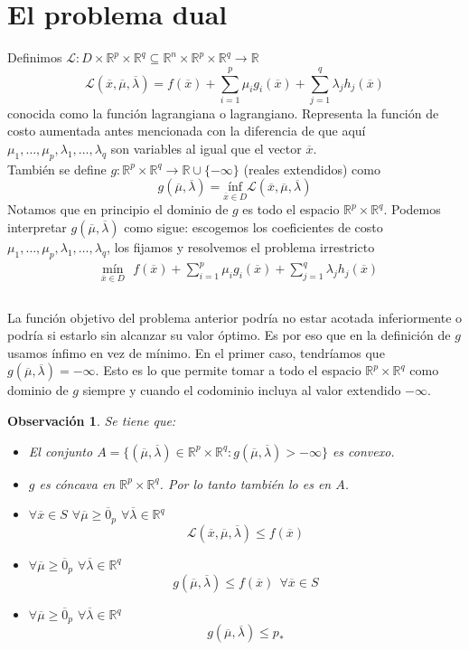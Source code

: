 \documentclass[11pt]{report}
\newtheorem{observation}{Observación}[section]
\newcommand{\Rn}{\mathbb{R}^{n}}
\newcommand{\Rp}{\mathbb{R}^{p}}
\newcommand{\Rq}{\mathbb{R}^{q}}
\newcommand{\R}{\mathbb{R}}
\newcommand{\mv}{\overline{\mu}}
\newcommand{\lv}{\overline{\lambda}}
\newcommand{\x}{\overline{x}}
\newcommand{\zp}{\overline{0}_{p}}
\newcommand{\La}{\mathcal{L}}
\newcommand{\po}{p_{*}}
\begin{document}
\section{El problema dual}
Definimos $\La: D\times\Rp\times\Rq\subseteq\Rn\times\Rp\times\Rq\rightarrow\R$ $$\La(\x,\mv,\lv)=f(\x)+\sum_{i=1}^{p}\mu_{i} g_{i}(\x) + \sum_{j=1}^{q}\lambda_{j} h_{j}(\x)$$
conocida como la función lagrangiana o lagrangiano. Representa la función de costo aumentada antes mencionada con la diferencia de que aquí $\mu_{1},\ldots,\mu_{p}, \lambda_{1},\ldots,\lambda_{q}$ son variables al igual que el vector $\x$.\\

También se define $g:\Rp\times\Rq\rightarrow\R\cup\{-\infty\}$ (reales extendidos) como
$$g(\mv, \lv)= \underset{\x\in D}{\text{ínf}}\La(\x,\mv,\lv)$$
Notamos que en principio el dominio de $g$ es todo el espacio $\Rp\times\Rq$. Podemos interpretar $g(\mv,\lv)$ como sigue: escogemos los coeficientes de costo $\mu_{1},\ldots,\mu_{p}, \lambda_{1},\ldots,\lambda_{q}$, los fijamos y resolvemos el problema irrestricto
\begin{equation*}
\begin{aligned}
& \underset{\x\in D}{\text{mín}}\ \ \ f(\x)+\sum_{i=1}^{p}\mu_{i} g_{i}(\x) + \sum_{j=1}^{q}\lambda_{j} h_{j}(\x) \\
\end{aligned}
\end{equation*}\\

La función objetivo del problema anterior podría no estar acotada inferiormente o podría si estarlo sin alcanzar su valor óptimo. Es por eso que en la definición de $g$ usamos ínfimo en vez de mínimo. En el primer caso, tendríamos que $g(\mv, \lv)=-\infty$. Esto es lo que permite tomar a todo el espacio $\Rp\times\Rq$ como dominio de $g$ siempre y cuando el codominio incluya al valor extendido $-\infty$.

\begin{observation} Se tiene que:
\begin{itemize}
\item[(i)] El conjunto $A=\{(\mv,\lv)\in\Rp\times\Rq: g(\mv,\lv)>-\infty\}$ es convexo.
\item[(ii)] $g$ es cóncava en $\Rp\times\Rq$. Por lo tanto también lo es en $A$.
\item[(iii)] $\forall\x\in S$ $\forall \mv\geq\zp$ $\forall\lv\in\Rq$
$$\La(\x,\mv, \lv)\leq f(\x)$$
\item[(iv)] $\forall \mv\geq\zp$ $\forall\lv\in\Rq$
$$g(\mv,\lv)\leq f(\x)\ \ \forall\x \in S$$
\item[(v)] $\forall \mv\geq\zp$ $\forall\lv\in\Rq$
$$g(\mv,\lv)\leq\po$$
\end{itemize}
\end{observation}
\end{document}
